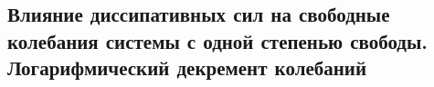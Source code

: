 

\subsection{Влияние диссипативных сил на свободные колебания системы с одной степенью свободы. Логарифмический декремент колебаний}



